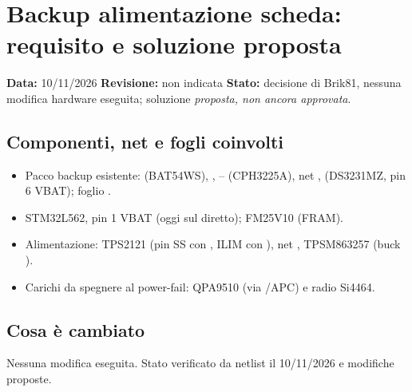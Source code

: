 \clearpage
\section{Backup alimentazione scheda: requisito e soluzione proposta}

\noindent\textbf{Data:} 10/11/2026 \quad \textbf{Revisione:} non indicata \quad \textbf{Stato:} decisione di Brik81, nessuna modifica hardware eseguita; soluzione \emph{proposta, non ancora approvata}.

\subsection{Componenti, net e fogli coinvolti}
\begin{itemize}[nosep]
  \item Pacco backup esistente:  (BAT54WS), , -- (CPH3225A), net ,  (DS3231MZ, pin 6 VBAT); foglio .
  \item {} STM32L562, pin 1 VBAT (oggi sul  diretto);  FM25V10 (FRAM).
  \item Alimentazione:  TPS2121 (pin SS con , ILIM con ), net ,  TPSM863257 (buck ).
  \item Carichi da spegnere al power-fail:  QPA9510 (via /APC) e radio Si4464.
\end{itemize}

\subsection{Cosa \`e cambiato}
Nessuna modifica eseguita. Stato verificato da netlist il 10/11/2026 e modifiche proposte.

